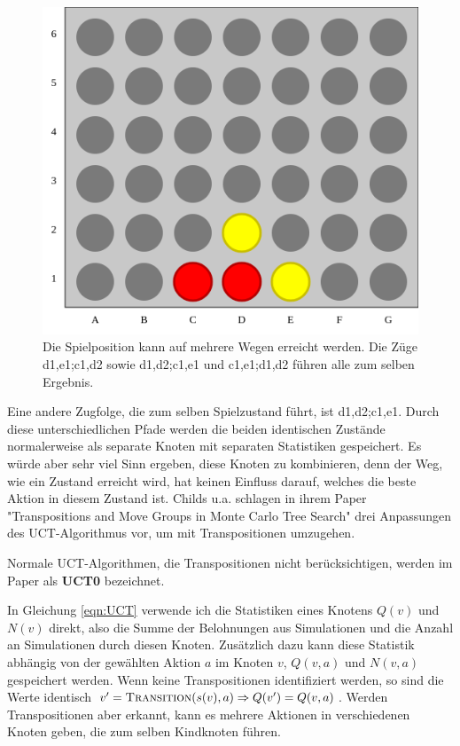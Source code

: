 \begin{figure}[hbt!]
	\centering
	\includegraphics[width=0.7\linewidth]{c4_transpos}
	\caption[Transposition in Vier Gewinnt]{Die Spielposition kann auf mehrere Wegen erreicht werden. Die Züge d1,e1;c1,d2 sowie d1,d2;c1,e1 und c1,e1;d1,d2 führen alle zum selben Ergebnis.}
	\label{fig:c4transpos}
\end{figure}

Eine andere Zugfolge, die zum selben Spielzustand führt, ist d1,d2;c1,e1. Durch diese unterschiedlichen Pfade werden die beiden identischen Zustände normalerweise als separate Knoten mit separaten Statistiken gespeichert. Es würde aber sehr viel Sinn ergeben, diese Knoten zu kombinieren, denn der Weg, wie ein Zustand erreicht wird, hat keinen Einfluss darauf, welches die beste Aktion in diesem Zustand ist. Childs u.a. schlagen in ihrem Paper "Transpositions and Move Groups in Monte Carlo Tree Search"\autocite[\ppno~390\psq]{childsTranspositionsMoveGroups2008} drei Anpassungen des UCT-Algorithmus vor, um mit Transpositionen umzugehen. 

Normale UCT-Algorithmen, die Transpositionen nicht berücksichtigen, werden im Paper als \textbf{UCT0} bezeichnet. 

In Gleichung \ref{eqn:UCT} verwende ich die Statistiken eines Knotens $Q(v)$ und $N(v)$ direkt, also die Summe der Belohnungen aus Simulationen und die Anzahl an Simulationen durch diesen Knoten. Zusätzlich dazu kann diese Statistik abhängig von der gewählten Aktion $a$ im Knoten $v$, $Q(v,a)$ und $N(v,a)$ gespeichert werden. Wenn keine Transpositionen identifiziert werden, so sind die Werte identisch $v^\prime = \textsc{Transition}(s(v),a) \Rightarrow Q(v^\prime) = Q(v,a)$. Werden Transpositionen aber erkannt, kann es mehrere Aktionen in verschiedenen Knoten geben, die zum selben Kindknoten führen.

